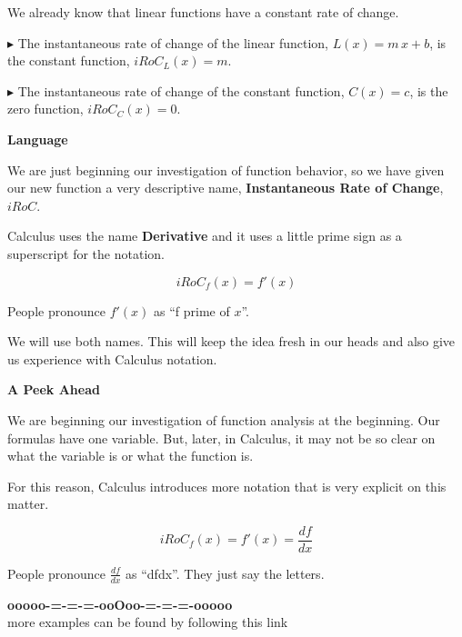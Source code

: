 \documentclass{ximera}
\begin{document}
We already know that linear functions have a constant rate of change.


\textbf{\textcolor{red!70!darkgray}{$\blacktriangleright$}} The instantaneous rate of change of the linear function, $L(x) = m \, x + b$, is the constant function, $iRoC_L(x) = m$. 



\textbf{\textcolor{red!70!darkgray}{$\blacktriangleright$}} The instantaneous rate of change of the constant function, $C(x) = c$, is the zero function, $iRoC_C(x) = 0$. 





\begin{notation} \textbf{\textcolor{red!50!green}{Language}} 


We are just beginning our investigation of function behavior, so we have given our new function a very descriptive name, \textbf{\textcolor{red!50!green}{Instantaneous Rate of Change}},  \textbf{\textcolor{red!50!green}{$iRoC$}}. 


Calculus uses the name \textbf{\textcolor{red!50!green}{Derivative}} and it uses a little prime sign as a superscript for the notation.



\[
iRoC_f(x) = f'(x)
\]


People pronounce $f'(x)$ as ``f prime of $x$''.


\end{notation}

We will use both names.  This will keep the idea fresh in our heads and also give us experience with Calculus notation.






\begin{notation} \textbf{\textcolor{red!50!green}{A Peek Ahead}}


We are beginning our investigation of function analysis at the beginning.  Our formulas have one variable.  But, later, in Calculus, it may not be so clear on what the variable is or what the function is. 

For this reason, Calculus introduces more notation that is very explicit on this matter.



\[
iRoC_f(x) = f'(x) = \frac{df}{dx}
\]


People pronounce $\frac{df}{dx}$ as ``dfdx''.  They just say the letters.


\end{notation}


















\begin{center}
\textbf{\textcolor{green!50!black}{ooooo-=-=-=-ooOoo-=-=-=-ooooo}} \\

more examples can be found by following this link\\ 

\end{center}
\end{document}
